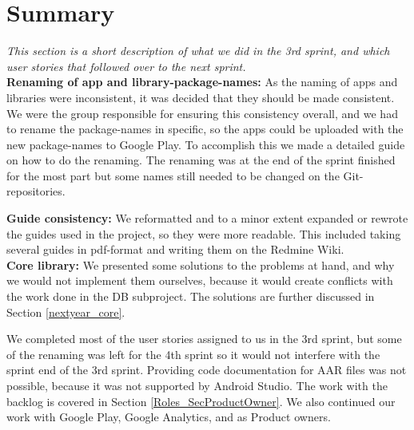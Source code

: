 \section{Summary}
\textit{This section is a short description of what we did in the 3rd sprint, and which user stories that followed over to the next sprint.}\\

\textbf{Renaming of app and library-package-names:}
As the naming of apps and libraries were inconsistent, it was decided that they should be made consistent. We were the group responsible for ensuring this consistency overall, and we had to rename the package-names in specific, so the apps could be uploaded with the new package-names to Google Play. To accomplish this we made a detailed guide on how to do the renaming. The renaming was at the end of the sprint finished for the most part but some names still needed to be changed on the Git-repositories.

\textbf{Guide consistency:}
We reformatted and to a minor extent expanded or rewrote the guides used in the project, so they were more readable. This included taking several guides in pdf-format and writing them on the Redmine Wiki.\\

\textbf{Core library:}
We presented some solutions to the problems at hand, and why we would not implement them ourselves, because it would create conflicts with the work done in the DB subproject. The solutions are further discussed in Section \ref{nextyear_core}.

We completed most of the user stories assigned to us in the 3rd sprint, but some of the renaming was left for the 4th sprint so it would not interfere with the sprint end of the 3rd sprint. Providing code documentation for AAR files was not possible, because it was not supported by Android Studio. The work with the backlog is covered in Section \ref{Roles_SecProductOwner}. We also continued our work with Google Play, Google Analytics, and as Product owners.